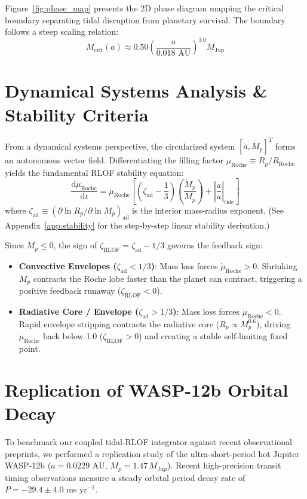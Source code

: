 \documentclass[twocolumn,10pt]{article}
\begin{document}
Figure~\ref{fig:phase_map} presents the 2D phase diagram mapping the critical boundary separating tidal disruption from planetary survival. The boundary follows a steep scaling relation:
\begin{equation}
M_{\text{crit}}(a) \approx 0.50 \left( \frac{a}{0.018\text{ AU}} \right)^{3.0} M_{\text{Jup}}
\end{equation}

\section{Dynamical Systems Analysis \& Stability Criteria} \label{sec:dynamical_systems}
From a dynamical systems perspective, the circularized system $[\dot{a}, \dot{M}_p]^T$ forms an autonomous vector field. Differentiating the filling factor $\mu_{\text{Roche}} \equiv R_p / R_{\text{Roche}}$ yields the fundamental RLOF stability equation:
\begin{equation}
\frac{\mathrm{d} \mu_{\text{Roche}}}{\mathrm{d}t} = \mu_{\text{Roche}} \left[ \left(\zeta_{\text{ad}} - \frac{1}{3}\right) \left(\frac{\dot{M}_p}{M_p}\right) + \left|\frac{\dot{a}}{a}\right|_{\text{tide}} \right]
\label{eq:stability_main}
\end{equation}
where $\zeta_{\text{ad}} \equiv (\partial \ln R_p / \partial \ln M_p)_{\text{ad}}$ is the interior mass-radius exponent. (See Appendix~\ref{app:stability} for the step-by-step linear stability derivation.)

Since $\dot{M}_p \le 0$, the sign of $\zeta_{\text{RLOF}} = \zeta_{\text{ad}} - 1/3$ governs the feedback sign:
\begin{itemize}
    \item \textbf{Convective Envelopes ($\zeta_{\text{ad}} < 1/3$)}: Mass loss forces $\dot{\mu}_{\text{Roche}} > 0$. Shrinking $M_p$ contracts the Roche lobe faster than the planet can contract, triggering a positive feedback runaway ($\zeta_{\text{RLOF}} < 0$).
    \item \textbf{Radiative Core / Envelope ($\zeta_{\text{ad}} > 1/3$)}: Mass loss forces $\dot{\mu}_{\text{Roche}} < 0$. Rapid envelope stripping contracts the radiative core ($R_p \propto M_p^{0.6}$), driving $\mu_{\text{Roche}}$ back below 1.0 ($\zeta_{\text{RLOF}} > 0$) and creating a stable self-limiting fixed point.
\end{itemize}

\section{Replication of WASP-12b Orbital Decay} \label{sec:wasp12b}
To benchmark our coupled tidal-RLOF integrator against recent observational preprints, we performed a replication study of the ultra-short-period hot Jupiter WASP-12b ($a = 0.0229\text{ AU}$, $M_p = 1.47\,M_{\text{Jup}}$). Recent high-precision transit timing observations measure a steady orbital period decay rate of $\dot{P} = -29.4 \pm 4.0\text{ ms yr}^{-1}$.
\end{document}
